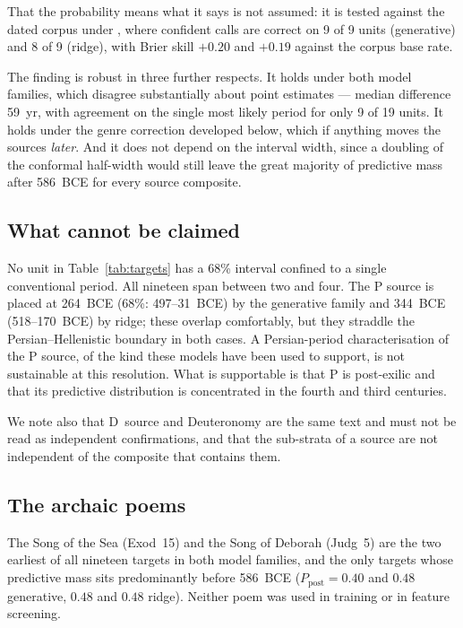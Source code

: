 \documentclass[10pt,letterpaper]{article}
\begin{document}
That the probability means what it says is not assumed: it is tested
against the dated corpus under , where confident
calls are correct on 9 of 9 units (generative) and 8 of 9 (ridge), with
Brier skill $+0.20$ and $+0.19$ against the corpus base rate.

The finding is robust in three further respects.  It holds under both
model families, which disagree substantially about point estimates ---
median difference 59~yr, with agreement on the single most likely period
for only 9 of 19 units.  It holds under the genre correction developed
below, which if anything moves the sources \emph{later}.  And it does not
depend on the interval width, since a doubling of the conformal half-width
would still leave the great majority of predictive mass after 586~BCE for
every source composite.

\subsection*{What cannot be claimed}

No unit in Table~\ref{tab:targets} has a 68\% interval confined to a
single conventional period.  All nineteen span between two and four.  The
P source is placed at 264~BCE (68\%: 497--31~BCE) by the generative family
and 344~BCE (518--170~BCE) by ridge; these overlap comfortably, but they
straddle the Persian--Hellenistic boundary in both cases.  A Persian-period characterisation of the P source, of the kind these
models have been used to support, is not sustainable at this resolution.  What is supportable is that P is post-exilic and that its
predictive distribution is concentrated in the fourth and third centuries.

We note also that D~source and Deuteronomy are the same text and must not
be read as independent confirmations, and that the sub-strata of a source
are not independent of the composite that contains them.

\subsection*{The archaic poems}

The Song of the Sea (Exod~15) and the Song of Deborah (Judg~5) are the two
earliest of all nineteen targets in both model families, and the only
targets whose predictive mass sits predominantly before 586~BCE
($P_{\mathrm{post}} = 0.40$ and $0.48$ generative, $0.48$ and $0.48$
ridge).  Neither poem was used in training or in feature screening.
\end{document}
